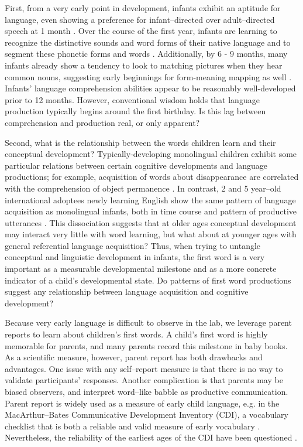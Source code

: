 \documentclass[10pt,letterpaper]{article}
\begin{document}
First, from a very early point in development, infants exhibit an aptitude for language, even showing a preference for infant--directed over adult--directed speech at 1 month \cite{cooper1990}.  Over the course of the first year, infants are learning to recognize the distinctive sounds and word forms of their native language \cite{kuhl2004} and to segment these phonetic forms and words \cite{werker2005}. Additionally, by 6 - 9  months, many infants already show a tendency to look to matching pictures when they hear common nouns, suggesting early beginnings for form-meaning mapping as well \cite{bergelson2012}. Infants' language comprehension abilities appear to be reasonably well-developed prior to 12 months. However, conventional wisdom holds that language production typically begins around the first birthday. Is this lag between comprehension and production real, or only apparent?

Second, what is the relationship between the words children learn and their conceptual development? Typically-developing monolingual children exhibit some particular relations between certain cognitive developments and language productions; for example, acquisition of words about disappearance are correlated with the comprehension of object permanence \cite{gopnik1986}.  In contrast, 2 and 5 year--old international adoptees newly learning English show the same pattern of language acquisition as monolingual infants, both in time course and pattern of productive utterances \cite{snedeker2005}. This dissociation suggests that at older ages conceptual development may interact very little with word learning, but what about at younger ages with general referential language acquisition? Thus, when trying to untangle conceptual and linguistic development in infants, the first word is a very important as a measurable developmental milestone and as a more concrete indicator of a child's developmental state.  Do patterns of first word productions suggest any relationship between language acquisition and cognitive development? 

Because very early language is difficult to observe in the lab, we leverage parent reports to learn about children's first words. A child's first word is highly memorable for parents, and many parents record this milestone in baby books. As a scientific measure, however, parent report has both drawbacks and advantages. One issue with any self--report measure is that there is no way to validate participants' responses. Another complication is that parents may be biased observers, and interpret word--like babble as productive communication. Parent report is widely used as a measure of early child language, e.g. in the MacArthur--Bates Communicative Development Inventory (CDI), a vocabulary checklist that is both a reliable and valid measure of early vocabulary \cite{fenson1994,fenson2007}. Nevertheless, the reliability of the earliest ages of the CDI have been questioned \cite{feldman2000}.
\end{document}

